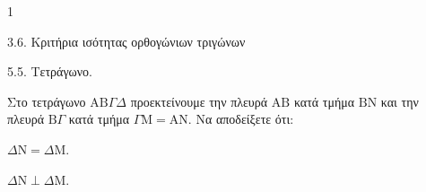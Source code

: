 \begin{ylh}{1}
    \item 3.6. Κριτήρια ισότητας ορθογώνιων τριγώνων
    \item 5.5. Τετράγωνο.
\end{ylh}
Στο τετράγωνο $\mathrm{A}\mathrm{B}\Gamma\Delta$ προεκτείνουμε την πλευρά $\mathrm{A}\mathrm{B}$ κατά τμήμα $\mathrm{B}\mathrm{N}$ και την πλευρά $\mathrm{B}\Gamma$ κατά τμήμα $\Gamma\mathrm{M} = \mathrm{A}\mathrm{N}$.
Να αποδείξετε ότι:
\begin{alist}
    \item $\Delta\mathrm{N} = \Delta\mathrm{M}$. 
    \item $\Delta\mathrm{N} \perp \Delta\mathrm{M}$. 
\end{alist}
